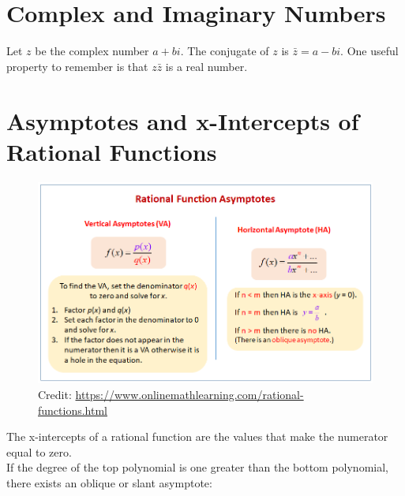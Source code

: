 \documentclass[12pt]{article}
\begin{document}
\section{Complex and Imaginary Numbers}

Let \(z\) be the complex number \(a+bi\). The conjugate of \(z\) is \(\bar{z}=a-bi\). One useful property to remember is that \(z\bar{z}\) is a real number.

\section{Asymptotes and x-Intercepts of Rational Functions}

\begin{figure}[H]
	\centering
	\includegraphics[scale=.75]{rational.png}
	\caption{Credit: \url{https://www.onlinemathlearning.com/rational-functions.html}}
\end{figure}

The x-intercepts of a rational function are the values that make the numerator equal to zero.\\

If the degree of the top polynomial is one greater than the bottom polynomial, there exists an oblique or slant asymptote:\\
\end{document}
